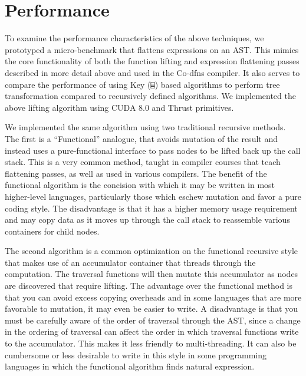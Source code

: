 ﻿\documentclass[numbers,10pt,preprint]{sigplanconf}
\begin{document}
\section{Performance}

To examine the performance characteristics of the above techniques, we prototyped a micro-benchmark that flattens expressions on an AST. This mimics the core functionality of both the function lifting and expression flattening passes described in more detail above and used in the Co-dfns compiler. It also serves to compare the performance of using Key (\verb;⌸;) based algorithms to perform tree transformation compared to recursively defined algorithms. We implemented the above lifting algorithm using CUDA 8.0 and Thrust primitives. 

We implemented the same algorithm using two traditional recursive methods. The first is a ``Functional'' analogue, that avoids mutation of the result and instead uses a pure-functional interface to pass nodes to be lifted back up the call stack. This is a very common method, taught in compiler courses that teach flattening passes, as well as used in various compilers. The benefit of the functional algorithm is the concision with which it may be written in most higher-level languages, particularly those which eschew mutation and favor a pure coding style. The disadvantage is that it has a higher memory usage requirement and may copy data as it moves up through the call stack to reassemble various containers for child nodes.

The second algorithm is a common optimization on the functional recursive style that makes use of an accumulator container that threads through the computation. The traversal functions will then mutate this accumulator as nodes are discovered that require lifting. The advantage over the functional method is that you can avoid excess copying overheads and in some languages that are more favorable to mutation, it may even be easier to write. A disadvantage is that you must be carefully aware of the order of traversal through the AST, since a change in the ordering of traversal can affect the order in which traversal functions write to the accumulator. This makes it less friendly to multi-threading. It can also be cumbersome or less desirable to write in this style in some programming languages in which the functional algorithm finds natural expression.
\end{document}
